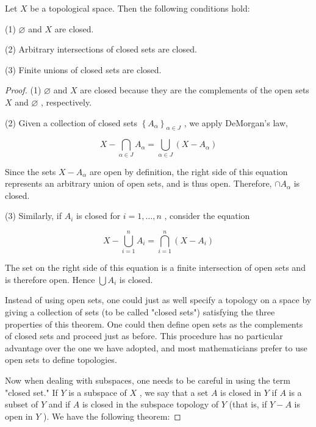 \begin{theorem} Let \(X\) be a topological space. Then the following conditions hold:

(1) \(\varnothing\) and \(X\) are closed.

(2) Arbitrary intersections of closed sets are closed.

(3) Finite unions of closed sets are closed.

\end{theorem}
\begin{proof}
(1) \(\varnothing\) and \(X\) are closed because they are the complements of the open sets \(X\) and \(\varnothing\) , respectively.

(2) Given a collection of closed sets \({\left\{  {A}_{\alpha }\right\}  }_{\alpha  \in  J}\) , we apply DeMorgan’s law,

\[
X - \mathop{\bigcap }\limits_{{\alpha  \in  J}}{A}_{\alpha } = \mathop{\bigcup }\limits_{{\alpha  \in  J}}\left( {X - {A}_{\alpha }}\right)
\]

Since the sets \(X - {A}_{\alpha }\) are open by definition, the right side of this equation represents an arbitrary union of open sets, and is thus open. Therefore, \(\cap  {A}_{\alpha }\) is closed.

(3) Similarly, if \({A}_{i}\) is closed for \(i = 1,\ldots ,n\) , consider the equation

\[
X - \mathop{\bigcup }\limits_{{i = 1}}^{n}{A}_{i} = \mathop{\bigcap }\limits_{{i = 1}}^{n}\left( {X - {A}_{i}}\right)
\]

The set on the right side of this equation is a finite intersection of open sets and is therefore open. Hence \(\bigcup {A}_{i}\) is closed.

Instead of using open sets, one could just as well specify a topology on a space by giving a collection of sets (to be called "closed sets") satisfying the three properties of this theorem. One could then define open sets as the complements of closed sets and proceed just as before. This procedure has no particular advantage over the one we have adopted, and most mathematicians prefer to use open sets to define topologies.

Now when dealing with subspaces, one needs to be careful in using the term "closed set." If \(Y\) is a subspace of \(X\) , we say that a set \(A\) is closed in \(Y\) if \(A\) is a subset of \(Y\) and if \(A\) is closed in the subspace topology of \(Y\) (that is, if \(Y - A\) is open in \(Y\) ). We have the following theorem:
\end{proof}

